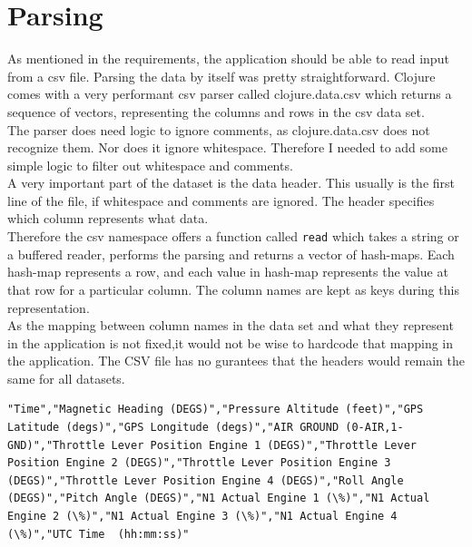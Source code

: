 \section{Parsing}

As mentioned in the requirements, the application should be able to read input from a csv file. Parsing the data by itself was pretty straightforward. Clojure comes with a very performant csv parser called clojure.data.csv which returns a sequence of vectors, representing the columns and rows in the csv data set. \\

The parser does need logic to ignore comments, as clojure.data.csv does not recognize them. Nor does it ignore whitespace. Therefore I needed to add some simple logic to filter out whitespace and comments. \\

A very important part of the dataset is the data header. This usually is the first line of the file, if whitespace and comments are ignored. The header specifies which column represents what data. \\

Therefore the csv namespace offers a function called \lstinline{read} which takes a string or a buffered reader, performs the parsing and returns a vector of hash-maps. Each hash-map represents a row, and each value in hash-map represents the value at that row for a particular column. The column names are kept as keys during this representation. \\

As the mapping between column names in the data set and what they represent in the application is not fixed,it would not be wise to hardcode that mapping in the application. The CSV file has no gurantees that the headers would remain the same for all datasets.\\

\begin{lstlisting}[caption= A sample header from the csv dataset]
"Time","Magnetic Heading (DEGS)","Pressure Altitude (feet)","GPS Latitude (degs)","GPS Longitude (degs)","AIR GROUND (0-AIR,1-GND)","Throttle Lever Position Engine 1 (DEGS)","Throttle Lever Position Engine 2 (DEGS)","Throttle Lever Position Engine 3 (DEGS)","Throttle Lever Position Engine 4 (DEGS)","Roll Angle (DEGS)","Pitch Angle (DEGS)","N1 Actual Engine 1 (\%)","N1 Actual Engine 2 (\%)","N1 Actual Engine 3 (\%)","N1 Actual Engine 4 (\%)","UTC Time  (hh:mm:ss)"
\end{lstlisting}

